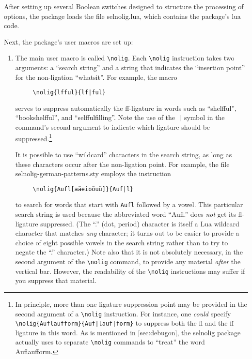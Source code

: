 \documentclass[12pt]{article}
\newcommand{\pkg}[1]{\textsf{#1}}
\newcommand{\opt}[1]{\texttt{#1}}
\newcommand{\cmmd}[1]{\texttt{\textbackslash #1}}
\begin{document}
After setting up several Boolean switches designed to structure the processing of options, the package loads the file \pkg{selnolig.lua}, which contains the package's lua code.

Next, the package's user macros are set up:
\begin{enumerate}
\item The main user macro is called \cmmd{nolig}. Each \cmmd{nolig} instruction takes two arguments: a \enquote{search string} and a string that indicates the \enquote{insertion point} for the non-ligation \enquote{whatsit}. For example, the macro
\begin{Verbatim}
     \nolig{lfful}{lf|ful}
\end{Verbatim}
serves to suppress automatically the ff-ligature in words such as \enquote{shelfful}, \enquote{bookshelfful}, and \enquote{selffulfilling}. Note the use of the~\Verb/|/ symbol in the command's second argument to indicate which ligature should be suppressed.\footnote{In principle, more than one ligature suppression point may be provided in the second argument of a \cmmd{nolig} instruction. For instance, one \emph{could} specify \Verb+\nolig{Auflaufform}{Auf|lauf|form}+ to suppress both the fl and the ff ligature in this word. As is mentioned in \cref{sec:debugon}, the \pkg{selnolig} package actually uses to separate \cmmd{nolig} commands to \enquote{treat} the word Auflaufform. }

\enlargethispage{1\baselineskip}

It is possible to use \enquote{wildcard} characters in the search string, as long as these characters occur after the non-ligation point. For example, the file \pkg{selnolig-german-patterns.sty} employs the instruction 
\begin{Verbatim}
     \nolig{Aufl[aäeioöuü]}{Auf|l}
\end{Verbatim}
to search for words that start with \opt{Aufl} followed by a vowel. This particular search string is used because the abbreviated word \enquote{Aufl.} does \emph{not} get its fl-ligature suppressed. (The \enquote{.} (dot, period) character is itself a Lua wildcard character that matches \emph{any} character; it turns out to be easier to provide a choice of eight possible vowels in the search string rather than to try to negate the \enquote{.} character.) Note also that it is not absolutely necessary, in the second argument of the \cmmd{nolig} command, to provide any material \emph{after} the vertical bar. However, the readability of the \cmmd{nolig} instructions may suffer if you suppress that material.


\end{enumerate}
\end{document}
